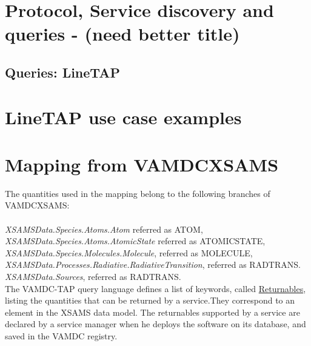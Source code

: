 \documentclass[11pt,a4paper]{ivoa}
\begin{document}
\section{Protocol, Service discovery and queries - (need better title)}

\subsection{ Queries: LineTAP }




\section{LineTAP use case examples}


\section{Mapping from VAMDCXSAMS}

The quantities used in the mapping belong to the following branches of VAMDCXSAMS:\\
\\
\textit{XSAMSData.Species.Atoms.Atom}  referred as ATOM,\\
\textit{XSAMSData.Species.Atoms.AtomicState}  referred as ATOMICSTATE,\\
\textit{XSAMSData.Species.Molecules.Molecule}, referred as MOLECULE,\\
\textit{XSAMSData.Processes.Radiative.RadiativeTransition}, referred as RADTRANS.\\
\textit{XSAMSData.Sources}, referred as RADTRANS.\\


The VAMDC-TAP query language defines a list of keywords, called 
\href{https://standards.vamdc.eu/dictionary/returnables.html}{Returnables}, 
listing the quantities that 
can be returned by a service.They correspond to an element in the XSAMS data model. 
The returnables supported by a service are declared by a service manager when he 
deploys the software on its database, and saved in the VAMDC registry. \\
\end{document}
